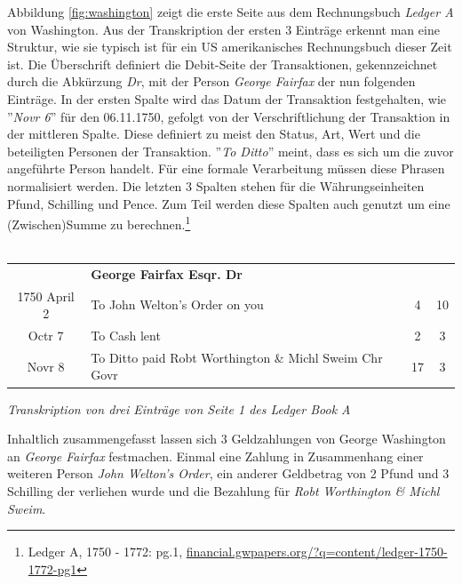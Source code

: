\documentclass[12pt,a4paper]{article}
\begin{document}
Abbildung \ref{fig:washington} zeigt die erste Seite aus dem Rechnungsbuch \textit{Ledger A} von Washington. Aus der Transkription der ersten 3 Einträge erkennt man eine Struktur, wie sie typisch ist für ein US amerikanisches Rechnungsbuch dieser Zeit ist. Die Überschrift definiert die Debit-Seite der Transaktionen, gekennzeichnet durch die Abkürzung \textit{Dr}, mit der Person \textit{George Fairfax} der nun folgenden Einträge. In der ersten Spalte wird das Datum der Transaktion festgehalten, wie ''\textit{Novr 6}'' für den 06.11.1750, gefolgt von der Verschriftlichung der Transaktion in der mittleren Spalte. Diese definiert zu meist den Status, Art, Wert und die beteiligten Personen der Transaktion. ''\textit{To Ditto}'' meint, dass es sich um die zuvor angeführte Person handelt. Für eine formale Verarbeitung müssen diese Phrasen normalisiert werden. Die letzten 3 Spalten stehen für die Währungseinheiten Pfund, Schilling und Pence. Zum Teil werden diese Spalten auch genutzt um eine (Zwischen)Summe zu berechnen.\footnote{Ledger A, 1750 - 1772: pg.1, \protect\url{financial.gwpapers.org/?q=content/ledger-1750-1772-pg1}}
\\
\\
\begin{tabular}{clcc}
& \textbf{George Fairfax Esqr. Dr}\\
1750 April 2 & To John Welton's Order on you & 4 & 10\\
Octr 7 & To Cash lent & 2 & 3 \\
Novr 8 & To Ditto paid Robt Worthington \& Michl Sweim Chr Govr &  17 & 3\\
\end{tabular}
\medskip
\begin{center}
\textit{Transkription von drei Einträge von Seite 1 des Ledger Book A}
\end{center}
Inhaltlich zusammengefasst lassen sich 3 Geldzahlungen von George Washington an \textit{George Fairfax} festmachen. Einmal eine Zahlung in Zusammenhang einer weiteren Person \textit{John Welton's Order}, ein anderer Geldbetrag von 2 Pfund und 3 Schilling der verliehen wurde und die Bezahlung für \textit{Robt Worthington \& Michl Sweim}.
\end{document}
